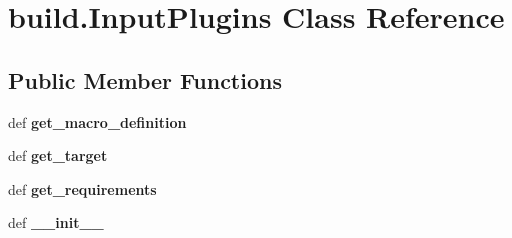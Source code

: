 \hypertarget{classbuild_1_1InputPlugins}{\section{build.\-Input\-Plugins \-Class \-Reference}
\label{classbuild_1_1InputPlugins}
}
\subsection*{\-Public \-Member \-Functions}
\begin{DoxyCompactItemize}
\item 
\hypertarget{classbuild_1_1InputPlugins_a0419bc7083f14d4ed9bc7468706fe505}{def {\bfseries get\-\_\-macro\-\_\-definition}}\label{classbuild_1_1InputPlugins_a0419bc7083f14d4ed9bc7468706fe505}

\item 
\hypertarget{classbuild_1_1InputPlugins_a443d87f2f42390b7f9b50c5ae760db23}{def {\bfseries get\-\_\-target}}\label{classbuild_1_1InputPlugins_a443d87f2f42390b7f9b50c5ae760db23}

\item 
\hypertarget{classbuild_1_1InputPlugins_a1026dab26100ce2dc3b9248d0791d774}{def {\bfseries get\-\_\-requirements}}\label{classbuild_1_1InputPlugins_a1026dab26100ce2dc3b9248d0791d774}

\item 
\hypertarget{classbuild_1_1InputPlugins_a9daf25c71f893ee693b455f5c1906080}{def {\bfseries \-\_\-\-\_\-init\-\_\-\-\_\-}}\label{classbuild_1_1InputPlugins_a9daf25c71f893ee693b455f5c1906080}

\end{DoxyCompactItemize}
